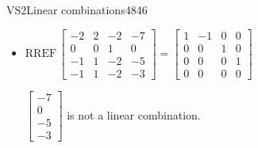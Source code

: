 \documentclass{article}
\begin{document}
\begin{exercise}{VS2}{Linear combinations}{4846}
\begin{exerciseAnswer}
\begin{itemize}
 
\item   \(
\mathrm{RREF}\, \left[\begin{array}{ccc|c}
-2 & 2 & -2 & -7 \\
0 & 0 & 1 & 0 \\
-1 & 1 & -2 & -5 \\
-1 & 1 & -2 & -3
\end{array}\right] = \left[\begin{array}{ccc|c}
1 & -1 & 0 & 0 \\
0 & 0 & 1 & 0 \\
0 & 0 & 0 & 1 \\
0 & 0 & 0 & 0
\end{array}\right]
                        \) 

 

 \(\left[\begin{array}{c}
-7 \\
0 \\
-5 \\
-3
\end{array}\right]\) is not a linear combination. 

 
\end{itemize}

     \end{exerciseAnswer}
 \end{exercise}
 
 
\end{document}
